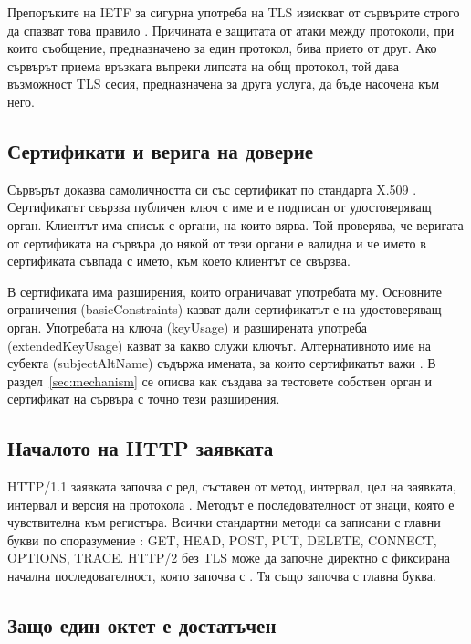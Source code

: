 Препоръките на IETF за сигурна употреба на TLS изискват от сървърите строго да спазват
това правило \cite[раздел 3.8]{rfc9325}. Причината е защитата от атаки между протоколи,
при които съобщение, предназначено за един протокол, бива прието от друг. Ако сървърът
приема връзката въпреки липсата на общ протокол, той дава възможност TLS сесия,
предназначена за друга услуга, да бъде насочена към него.

\subsection{Сертификати и верига на доверие}

Сървърът доказва самоличността си със сертификат по стандарта X.509 \cite{rfc5280}.
Сертификатът свързва публичен ключ с име и е подписан от удостоверяващ орган. Клиентът
има списък с органи, на които вярва. Той проверява, че веригата от сертификата на сървъра
до някой от тези органи е валидна и че името в сертификата съвпада с името, към което
клиентът се свързва.

В сертификата има разширения, които ограничават употребата му. Основните ограничения
(basicConstraints) казват дали сертификатът е на удостоверяващ орган. Употребата на ключа
(keyUsage) и разширената употреба (extendedKeyUsage) казват за какво служи ключът.
Алтернативното име на субекта (subjectAltName) съдържа имената, за които сертификатът
важи \cite{rfc5280}. В раздел~\ref{sec:mechanism} се описва как  създава за
тестовете собствен орган и сертификат на сървъра с точно тези разширения.

\subsection{Началото на HTTP заявката}

HTTP/1.1 заявката започва с ред, съставен от метод, интервал, цел на заявката, интервал
и версия на протокола \cite[раздел 3]{rfc9112}. Методът е последователност от знаци,
която е чувствителна към регистъра. Всички стандартни методи са записани с главни букви
по споразумение \cite[раздел 9.1]{rfc9110}: GET, HEAD, POST, PUT, DELETE, CONNECT,
OPTIONS, TRACE. HTTP/2 без TLS може да започне директно с фиксирана начална
последователност, която започва с  \cite[раздел 3.4]{rfc9113}.
Тя също започва с главна буква.

\subsection{Защо един октет е достатъчен}

